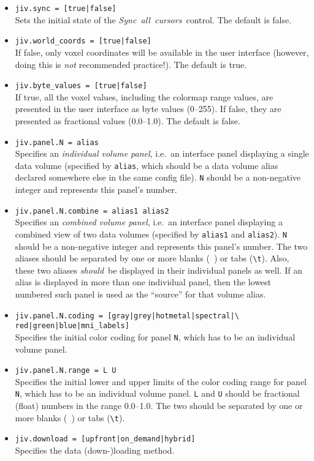 \begin{itemize}
\item \verb+jiv.sync = [true|false]+ \\
  Sets the initial state of the \mbox{\em Sync all cursors}\ control.
  The default is false.
\item \verb+jiv.world_coords = [true|false]+ \\
  If false, only voxel coordinates will be available in the user
  interface (however, doing this is \emph{not} recommended practice!).
  The default is true.
\item \verb+jiv.byte_values = [true|false]+ \\
  If true, all the voxel values, including the colormap range values,
  are presented in the user interface as byte values (0--255). If
  false, they are presented as fractional values (0.0--1.0). The
  default is false.
\item \verb+jiv.panel.N = alias+ \\
  Specifies an {\em individual volume panel}, i.e.\ an interface panel
  displaying a single data volume (specified by \verb+alias+, which
  should be a data volume alias declared somewhere else in the same
  config file).  \verb+N+ should be a non-negative integer and
  represents this panel's number.
\item \verb+jiv.panel.N.combine = alias1 alias2+ \\
  Specifies an {\em combined volume panel}, i.e.\ an interface panel
  displaying a combined view of two data volumes (specified by
  \verb+alias1+ and \verb+alias2+). \verb+N+ should be a non-negative
  integer and represents this panel's number. The two aliases should
  be separated by one or more blanks (\verb*+ +) or tabs (\verb+\t+).
  Also, these two aliases {\em should}\ be displayed in their
  individual panels as well. If an alias is displayed in more than one
  individual panel, then the lowest numbered such panel is used as the
  ``source'' for that volume alias.
\item \verb+jiv.panel.N.coding = [gray|grey|hotmetal|spectral|\+ \\
      \verb+red|green|blue|mni_labels]+ \\
  Specifies the initial color coding for panel \verb+N+, which has to
  be an individual volume panel.
\item \verb+jiv.panel.N.range = L U+ \\
  Specifies the initial lower and upper limits of the color coding
  range for panel \verb+N+, which has to be an individual volume
  panel. \verb+L+ and \verb+U+ should be fractional (float) numbers in
  the range 0.0--1.0.  The two should be separated by one or more
  blanks (\verb*+ +) or tabs (\verb+\t+).
\item \verb+jiv.download = [upfront|on_demand|hybrid]+ \\
  Specifies the data (down-)loading method. 


\end{itemize}

